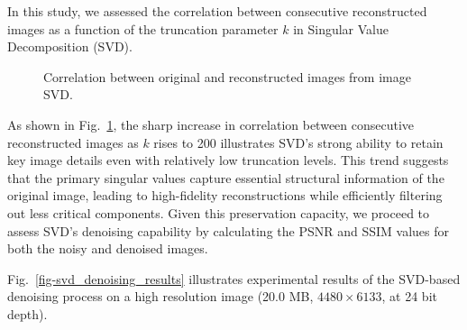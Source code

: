 \documentclass[
  journal,
]{IEEEtran}%
\begin{document}
In this study, we assessed the correlation between consecutive
reconstructed images as a function of the truncation parameter \(k\) in
Singular Value Decomposition (SVD).

\begin{figure}


\caption{\label{fig-corr-slice}Correlation between original and
reconstructed images from image SVD.}

\end{figure}%

As shown in Fig.~\ref{fig-corr-slice}, the sharp increase in correlation
between consecutive reconstructed images as \(k\) rises to 200
illustrates SVD's strong ability to retain key image details even with
relatively low truncation levels. This trend suggests that the primary
singular values capture essential structural information of the original
image, leading to high-fidelity reconstructions while efficiently
filtering out less critical components. Given this preservation
capacity, we proceed to assess SVD's denoising capability by calculating
the PSNR and SSIM values for both the noisy and denoised images.

Fig.~\ref{fig-svd_denoising_results} illustrates experimental results of
the SVD-based denoising process on a high resolution image (20.0 MB,
\(4480\times 6133\), at 24 bit depth).
\end{document}
